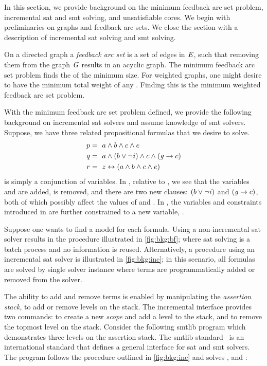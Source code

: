 \label{section:background}
%

%

In this section, we provide background on the minimum feedback arc set problem,
incremental \ac{sat} and \ac{smt} solving, and unsatisfiable cores. We begin
with preliminaries on graphs and feedback arc sets. We close the section with a
description of incremental \ac{sat} solving and \ac{smt} solving.

On a directed graph  a \emph{feedback arc set}  is a set
of edges in $\mathit{E}$, such that removing them from the graph $\mathit{G}$ results in
an acyclic graph. The minimum feedback arc set problem finds the
 of the minimum size. For weighted graphs, one might desire
 to have the minimum total weight of any . Finding this
 is the minimum weighted feedback arc set problem.

%
%
With the minimum feedback arc set problem defined, we provide the following
background on incremental \ac{sat} solvers and assume knowledge of \ac{smt}
solvers. Suppose, we have three related propositional formulas that we desire to
solve.
%
\begin{align*}
  p &=\ a \wedge b \wedge c \wedge e  \\
  q &=\ a \wedge (b \vee \neg \mathit{i}{}) \wedge c \wedge (\mathit{g}{} \rightarrow c) \\
  r &=~z \leftrightarrow (a \wedge b \wedge c \wedge e)
\end{align*}
%
\pV{} is simply a conjunction of variables. In \qV{}, relative to \pV{}, we see
that the variables \iV{} and \gV{} are added, \eV{} is removed, and there are
two new clauses: $(b \vee \neg \mathit{i}{})$ and $(\mathit{g}{} \rightarrow c)$, both of
which possibly affect the values of \bV{} and \cV{}. In \rV{}, the variables and
constraints introduced in \pV{} are further constrained to a new variable,
\zV{}.

Suppose one wants to find a model for each formula. Using a non-incremental
\ac{sat} solver results in the procedure illustrated in \autoref{fig:bkg:bf};
where \ac{sat} solving is a batch process and no information is reused.
Alternatively, a procedure using an incremental \ac{sat} solver is illustrated
in \autoref{fig:bkg:inc}; in this scenario, all formulas are solved by single
solver instance where terms are programmatically added or removed from the
solver.

The ability to add and remove terms is enabled by manipulating the
\textit{assertion stack}, to add or remove levels on the stack. The incremental
interface provides two commands:  to create a new \emph{scope} and add
a level to the stack, and  to remove the topmost level on the stack.
Consider the following \acl{smtlib} program which demonstrates three levels on
the assertion stack. The \acl{smtlib} standard~\cite{BarFT-SMTLIB} is an
international standard that defines a general interface for \ac{sat} and
\ac{smt} solvers. The program follows the procedure outlined in
\autoref{fig:bkg:inc} and solves \pV, \qV{} and \rV{}:

